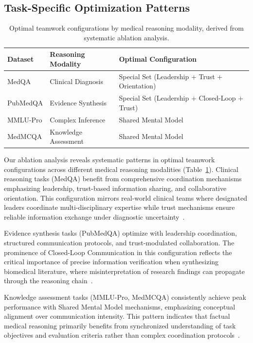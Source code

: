 \documentclass[letterpaper]{article} %
\begin{document}
\subsection{Task-Specific Optimization Patterns}

\begin{table}[htbp]
\centering
\caption{Optimal teamwork configurations by medical reasoning modality, derived from systematic ablation analysis.}
\label{tab:optimal_configs}
\scriptsize
\begin{tabular}{l|l|l}
\hline
\textbf{Dataset} & \textbf{Reasoning Modality} & \textbf{Optimal Configuration} \\
\hline
MedQA & Clinical Diagnosis & Special Set (Leadership + Trust + Orientation) \\
PubMedQA & Evidence Synthesis & Special Set (Leadership + Closed-Loop + Trust) \\
MMLU-Pro & Complex Inference & Shared Mental Model \\
MedMCQA & Knowledge Assessment & Shared Mental Model \\
\hline
\end{tabular}
\end{table}

Our ablation analysis reveals systematic patterns in optimal teamwork configurations across different medical reasoning modalities (Table~\ref{tab:optimal_configs}). Clinical reasoning tasks (MedQA) benefit from comprehensive coordination mechanisms emphasizing leadership, trust-based information sharing, and collaborative orientation. This configuration mirrors real-world clinical teams where designated leaders coordinate multi-disciplinary expertise while trust mechanisms ensure reliable information exchange under diagnostic uncertainty~\citep{kim2024mdagents}.

Evidence synthesis tasks (PubMedQA) optimize with leadership coordination, structured communication protocols, and trust-modulated collaboration. The prominence of Closed-Loop Communication in this configuration reflects the critical importance of precise information verification when synthesizing biomedical literature, where misinterpretation of research findings can propagate through the reasoning chain~\citep{bandow2001time}.

Knowledge assessment tasks (MMLU-Pro, MedMCQA) consistently achieve peak performance with Shared Mental Model mechanisms, emphasizing conceptual alignment over communication intensity. This pattern indicates that factual medical reasoning primarily benefits from synchronized understanding of task objectives and evaluation criteria rather than complex coordination protocols~\citep{cannon1995team}.
\end{document}
